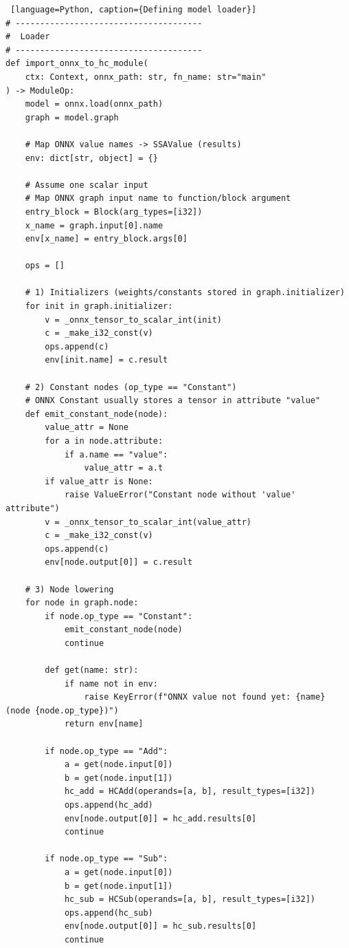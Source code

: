 \documentclass[../main.tex]{subfiles}
\begin{document}
\begin{lstlisting} [language=Python, caption={Defining model loader}]
# --------------------------------------
#  Loader
# --------------------------------------
def import_onnx_to_hc_module(
    ctx: Context, onnx_path: str, fn_name: str="main"
) -> ModuleOp:
    model = onnx.load(onnx_path)
    graph = model.graph

    # Map ONNX value names -> SSAValue (results)
    env: dict[str, object] = {}

    # Assume one scalar input
    # Map ONNX graph input name to function/block argument
    entry_block = Block(arg_types=[i32])
    x_name = graph.input[0].name
    env[x_name] = entry_block.args[0]

    ops = []

    # 1) Initializers (weights/constants stored in graph.initializer)
    for init in graph.initializer:
        v = _onnx_tensor_to_scalar_int(init)
        c = _make_i32_const(v)
        ops.append(c)
        env[init.name] = c.result

    # 2) Constant nodes (op_type == "Constant")
    # ONNX Constant usually stores a tensor in attribute "value"
    def emit_constant_node(node):
        value_attr = None
        for a in node.attribute:
            if a.name == "value":
                value_attr = a.t
        if value_attr is None:
            raise ValueError("Constant node without 'value' attribute")
        v = _onnx_tensor_to_scalar_int(value_attr)
        c = _make_i32_const(v)
        ops.append(c)
        env[node.output[0]] = c.result

    # 3) Node lowering
    for node in graph.node:
        if node.op_type == "Constant":
            emit_constant_node(node)
            continue

        def get(name: str):
            if name not in env:
                raise KeyError(f"ONNX value not found yet: {name} (node {node.op_type})")
            return env[name]

        if node.op_type == "Add":
            a = get(node.input[0])
            b = get(node.input[1])
            hc_add = HCAdd(operands=[a, b], result_types=[i32])
            ops.append(hc_add)
            env[node.output[0]] = hc_add.results[0]
            continue

        if node.op_type == "Sub":
            a = get(node.input[0])
            b = get(node.input[1])
            hc_sub = HCSub(operands=[a, b], result_types=[i32])
            ops.append(hc_sub)
            env[node.output[0]] = hc_sub.results[0]
            continue


\end{lstlisting}
\end{document}
